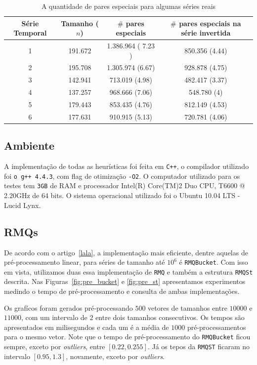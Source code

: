 \documentclass[12pt]{article}
\begin{document}
\begin{table}
\small
\begin{center}
\begin{tabular}{|c|c|c|c|}
\hline
 {\bf Série Temporal}  & {\bf Tamanho} ($n$) & {\bf $\#$ pares especiais} & {\bf $\# $ pares especiais na série invertida} \\ 
\hline
 1 & 191.672   & 1.386.964 ( 7.23 ) &  850.356 (4.44) \\
\hline
 2 & 195.708 & 1.305.974  (6.67) & 928.878 (4.75)\\
\hline
 3 & 142.941 &   713.019 (4.98) & 482.417  (3.37) \\
\hline
 4 & 137.257 &  968.666  (7.06) &  548.780 (4)\\
\hline
 5 & 179.443 & 853.435 (4.76) &  812.149 (4.53) \\
\hline
6  &  177.631 &  910.915 (5.13) &  720.781  (4.06) \\ \hline
\end{tabular}
\end{center}
\label{tab:Special-pairs}
\caption{A quantidade de pares especiais para algumas séries reais}
\normalsize
\end{table}


\subsection{Ambiente}

A implementação de todas as heurísticas foi feita em \verb|C++|, o compilador
utilizado foi \verb|o g++ 4.4.3|, com flag de otimização \verb|-O2|. O computador
utilizado para os testes tem \verb|3GB| de RAM e processador Intel(R) Core(TM)2 Duo CPU, T6600  @ 2.20GHz
de 64 bits. O sistema operacional utilizado foi o Ubuntu 10.04 LTS - Lucid Lynx.


\subsection{RMQs}

De acordo com o artigo~\ref{lala}, a implementação mais eficiente, dentre aquelas
de pré-processamento linear, para séries de tamanho até $10^6$ é {\tt RMQBucket}.
Com isso em vista, utilizamos duas essa implementação de {\tt RMQ} e também a estrutura
{\tt RMQSt} descrita. Nas Figuras~\ref{fig:pre_bucket} e \ref{fig:pre_st} apresentamos experimentos medindo o tempo de pré-processamento
e consulta de ambas implementações.

Os grafícos foram gerados pré-processando $500$ vetores de tamanhos entre
$10000$ e $11000$, com um intervalo de $2$ entre dois tamanhos consecutivos.
Os tempos são apresentados em milisegundos e cada um é a média
de $1000$ pré-processamentos para o mesmo vetor. Note que o tempo de pré-processamento
do {\tt RMQBucket} ficou sempre, exceto por \textit{outliers}, entre $[0.22, 0.255]$.
Já os tepos da {\tt RMQST} ficaram no intervalo $[0.95, 1.3]$, novamente, exceto por \textit{outliers}.
\end{document}
